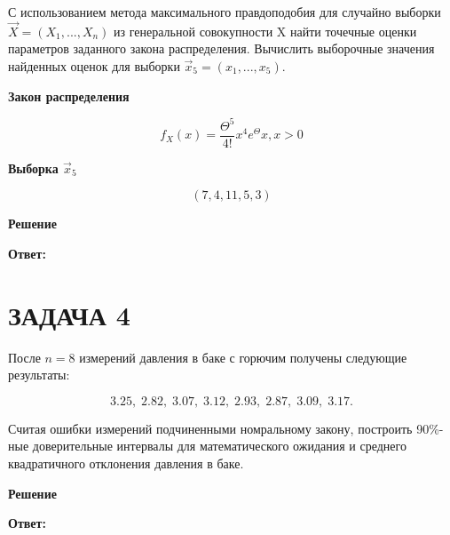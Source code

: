 \documentclass[12pt, a4paper]{report}
\begin{document}
	\hspace{1cm} С использованием метода максимального правдоподобия для случайно выборки $\vec{X} = (X_1, ..., X_n)$ из генеральной совокупности X найти точечные оценки параметров заданного закона распределения. Вычислить выборочные значения найденных оценок для выборки $\vec{x}_5 = (x_1, ..., x_5)$.
	
	\vspace{0.5cm}
	\textbf{Закон распределения}
	
	\begin{equation*}
	f_X(x) = \frac{\Theta^5}{4!}  x^4  e^\Theta x, x > 0
	\end{equation*}
	
	\textbf{Выборка $\vec x_5$}
	
	\begin{equation*}
	(7, 4, 11, 5, 3)
	\end{equation*}
	
	\vspace{0.2cm}
	\textbf{Решение}
	
	\vspace{0.5cm}
	\textbf{Ответ:}
	
	
	
	
	
	
	
	
	\newpage
	
	\section{ЗАДАЧА 4}
	
	\hspace{0.4cm} После $n = 8$ измерений давления в баке с горючим получены следующие результаты:
	
	\begin{equation*}
	3.25,\; 2.82,\; 3.07,\; 3.12,\; 2.93,\; 2.87,\; 3.09,\; 3.17.
	\end{equation*}
	
	Считая ошибки измерений подчиненными номральному закону, построить 90\%-ные доверительные интервалы для математического ожидания и среднего квадратичного отклонения давления в баке.
	
	
	\vspace{0.2cm}
	\textbf{Решение}
	
	\vspace{0.5cm}
	\textbf{Ответ:}
	
\end{document}
